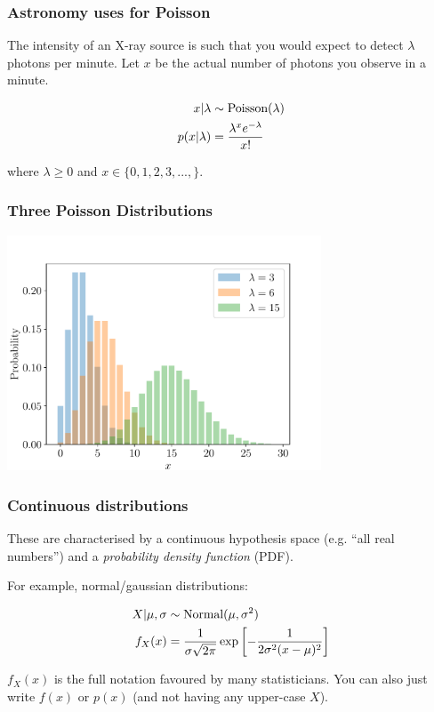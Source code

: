 \documentclass{beamer}
\begin{document}
\begin{frame}[t, fragile]
\frametitle{Astronomy uses for Poisson}


The intensity of an X-ray source is such that you would expect to detect
$\lambda$ photons per minute. Let $x$ be the actual number of photons you
observe in a minute.

\begin{align}
x | \lambda &\sim \textnormal{Poisson}(\lambda) \\
p(x | \lambda) &= \frac{\lambda^x e^{-\lambda}}{x!}
\end{align}

where $\lambda \geq 0$ and $x \in \{0, 1, 2, 3, ..., \}$.


\end{frame}


\begin{frame}[t, fragile]
\frametitle{Three Poisson Distributions}

\begin{center}
  \includegraphics[width=0.7\textwidth]{poisson.pdf}
\end{center}

\end{frame}


\begin{frame}[t, fragile]
\frametitle{Continuous distributions}

These are characterised by a continuous hypothesis space (e.g.
``all real numbers'') and a {\em probability density function} (PDF).
\vspace{1em}

For example, normal/gaussian distributions:

\begin{align}
X | \mu, \sigma &\sim \textnormal{Normal}(\mu, \sigma^2) \\
f_X(x) &= \frac{1}{\sigma \sqrt{2\pi}} \exp\left[-\frac{1}{2\sigma^2(x-\mu)^2}\right]
\end{align}

$f_X(x)$ is the full notation favoured by many statisticians.
You can also just write $f(x)$ or $p(x)$ (and not having any upper-case $X$).

\end{frame}
\end{document}
